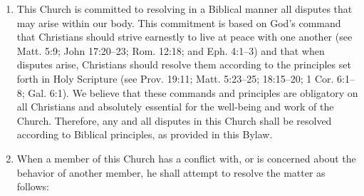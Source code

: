 \documentclass[
]{book}
\begin{document}
\begin{enumerate}
\def\labelenumi{\alph{enumi}.}
\item
  This Church is committed to resolving in a Biblical manner all disputes that may arise within our body. This commitment is based on God's command that Christians should strive earnest­ly to live at peace with one another (see Matt. 5:9; John 17:20--23; Rom. 12:18; and Eph. 4:1--3) and that when disputes arise, Christians should resolve them according to the principles set forth in Holy Scripture (see Prov. 19:11; Matt. 5:23--25; 18:15--20; 1 Cor. 6:1--8; Gal. 6:1). We believe that these commands and principles are obligatory on all Christians and absolutely essential for the well-being and work of the Church. Therefore, any and all dis­putes in this Church shall be resolved according to Biblical principles, as provided in this Bylaw.
\item
  When a member of this Church has a conflict with, or is concerned about the behavior of another member, he shall attempt to resolve the matter as follows:


\end{enumerate}
\end{document}
